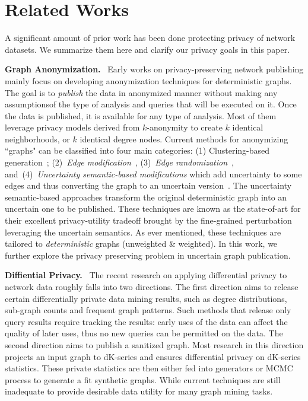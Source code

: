 \section{Related Works}
A significant amount of prior work has been done protecting privacy of network datasets.
We summarize them here and clarify our privacy goals in this paper. 

\textbf{Graph Anonymization.}~ Early works on privacy-preserving network publishing mainly focus on developing anonymization techniques for deterministic graphs. The goal is to \emph{publish} the data in anonymized manner without making any assumptionsof the type of analysis and queries that will be executed on it. Once the data is published, it is available for any type of analysis. 
Most of them leverage privacy models derived from $k$-anonymity to create $k$ identical neighborhoods, or $k$ identical degree nodes. Current methods for anonymizing ``graphs" can be classified into four main categories: (1) Clustering-based generation~\cite{Hay_Anonymizing_2007,Bhagat_Class_2009,hay2010resisting}; (2)~{\em Edge modification}~\cite{Liu_Towards_2008, Zhou_Preserving_2008, Wang2011, Wu_k_2010, Skarkala_Privacy_2012}, 
(3)~{\em Edge randomization}~\cite{Liu_Privacy_2009,Ying_Randomizing_2008, Ninggal_Utility_2015},
and~(4)~{\em Uncertainty semantic-based modifications} which add uncertainty to some edges and thus converting the graph to an uncertain version~\cite{Boldi_Injecting_2012, Nguyen_Anonymizing_2015}. 
The uncertainty semantic-based approaches transform the original deterministic graph into an uncertain one to be published. These techniques are known as the state-of-art for their excellent privacy-utility tradeoff brought by the fine-grained perturbation leveraging the uncertain semantics. As ever mentioned, these techniques are tailored to \emph{deterministic} graphs (unweighted \& weighted). In this work, we further explore the privacy preserving problem in uncertain graph publication. 


\textbf{Diffiential Privacy.}~ The recent research on applying differential privacy to network data roughly falls into two directions. The first direction aims to release certain differentially private data mining results, such as degree distributions, sub-graph counts and frequent graph patterns. Such methods that release only query results require tracking the results: early uses of the data can affect the quality of later uses, thus no new queries can be permitted on the data.  
The second direction aims to publish a sanitized graph. Most research in this direction projects an input graph to dK-series and ensures differential privacy on dK-series statistics. These private statistics are then either fed into generators or MCMC process to generate a fit synthetic graphs. While current techniques are still inadequate to provide desirable data utility for many graph mining tasks. 



